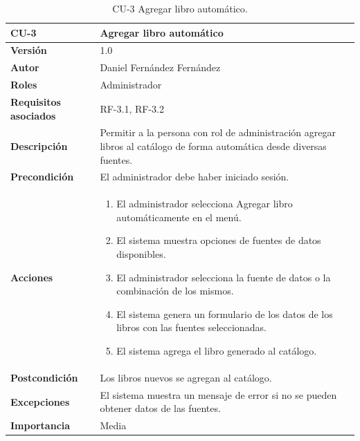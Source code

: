 \begin{table}[p]
        \centering
        \begin{tabularx}{\linewidth}{ p{} p{} }
            \toprule
            \textbf{CU-3} & \textbf{Agregar libro automático}\\
            \toprule
            \textbf{Versión} & 1.0 \\
            \textbf{Autor} & Daniel Fernández Fernández \\
            \textbf{Roles} & Administrador \\
            \textbf{Requisitos asociados} & RF-3.1, RF-3.2 \\
            \textbf{Descripción} & Permitir a la persona con rol de administración agregar libros al catálogo de forma automática desde diversas fuentes. \\
            \textbf{Precondición} & El administrador debe haber iniciado sesión. \\
            \textbf{Acciones} &
            \begin{enumerate}
            \def\labelenumi{\arabic{enumi}.}
            \tightlist
            \item El administrador selecciona Agregar libro automáticamente en el menú.
            \item El sistema muestra opciones de fuentes de datos disponibles.
            \item El administrador selecciona la fuente de datos o la combinación de los mismos.
            \item El sistema genera un formulario de los datos de los libros con las fuentes seleccionadas.
            \item El sistema agrega el libro generado al catálogo.
            \end{enumerate}\\
            \textbf{Postcondición} & Los libros nuevos se agregan al catálogo. \\
            \textbf{Excepciones} & El sistema muestra un mensaje de error si no se pueden obtener datos de las fuentes. \\
            \textbf{Importancia} & Media \\
            \bottomrule
        \end{tabularx}
        \caption{CU-3 Agregar libro automático.}
\end{table}

